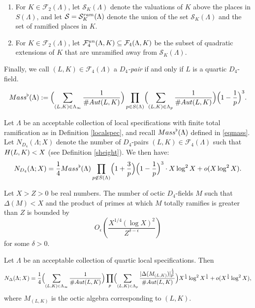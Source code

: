 \documentclass[10pt,a4paper]{amsart}
\def\Aut{{\rm Aut}}
\def\FF{{\mathcal F}}
\def\H{{\rm H}}
\def\Mass{{\rm Mass}}
\def\cF{{\mathcal F}}
\def\cS{{\mathcal S}}
\def\un{{\rm un}}
\begin{document}
\begin{defn}
\begin{enumerate}
  \item[{\rm (e)}] For 
$K \in \FF_2(\Lambda)$, let $\cS_{K}(\Lambda)$ denote the valuations of $K$ above the
places in $S(\Lambda)$, and let
$\cS =\cS_K^{\rm ram}(\Lambda)$ denote the union of the set $\cS_K(\Lambda)$ and the set of
ramified places in $K$.
\item[{\rm (f)}] For $K\in\cF_2(\Lambda)$, let $\FF_4^\un(\Lambda,K)
  \subseteq \cF_4(\Lambda,K)$ be the subset of quadratic extensions
  of $K$ that are unramified away from $\cS_K(\Lambda)$.
\end{enumerate}
Finally, we call $(L,K) \in \FF_4(\Lambda)$ a {\em $D_4$-pair} if and only if $L$ is a quartic $D_4$-field. 
\end{defn}

\begin{equation}\label{eqmass}
\Mass^\flat(\Lambda):=\Bigl(\sum_{(L,K)\in\Lambda_\infty}\frac{1}{\#\Aut(L,K)}\Bigr)
\prod_{p\in S(\Lambda)} \Bigl(\sum_{(L,K)\in\Lambda_p}
\frac{1}{\#\Aut(L,K)}\Bigr)\Bigl( 1-\frac{1}{p}\Bigr)^3.
\end{equation}

\begin{thm}\label{thD4quar}
Let $\Lambda$ be an acceptable collection of local
specifications with finite total ramification as in Definition \ref{localspec},   and recall $\Mass^\flat(\Lambda)$ defined in \eqref{eqmass}. Let $N_{D_4}(\Lambda;X)$
denote the number of $D_4$-pairs $(L,K)\in\FF_4(\Lambda)$ such that
$\H(L,K)<X$ (see Definition \ref{sheight}). We then have:
\begin{equation*}
N_{D_4}(\Lambda;X)=\frac{1}{4}\Mass^\flat(\Lambda)\prod_{p\not\in S(\Lambda)}
\Bigl(1+\frac{3}{p}\Bigr)\Bigl(1-\frac{1}{p}\Bigr)^3\cdot X\log^2 X
+o(X\log^2 X).
\end{equation*}
\end{thm}

\begin{thm}\label{thunif}
Let $X>Z>0$ be real numbers. The number of octic $D_4$-fields $M$ such
that $\Delta(M)<X$ and the product of primes at which $M$ totally
ramifies is greater than $Z$ is bounded by $$O_\epsilon\left(\frac{X^{1/4}(\log
X)^2}{Z^{\delta-\epsilon}}\right)$$ for some $\delta > 0$.
\end{thm}

\begin{thm}\label{th:congQuartic}
Let $\Lambda$ be an acceptable collection of quartic local
specifications. Then
\begin{equation*}
N_\Delta(\Lambda;X)=\frac{1}{4}\Bigl(\sum_{(L,K)\in\Lambda_\infty}\frac{1}{\#\Aut(L,K)}\Bigr)
\prod_p\Bigl(\sum_{(L,K)\in\Lambda_p}\frac{|\Delta(M_{(L,K)})|_p^{\frac14}}{\#\Aut(L,K)}\Bigr)
X^{\frac14}\log^2 X^{\frac14}+o(X^{\frac14}\log^2 X),
\end{equation*}
where $M_{(L,K)}$ is the octic algebra corresponding to $(L,K)$.
\end{thm}
\end{document}
